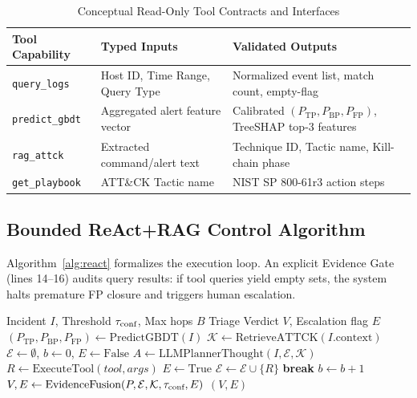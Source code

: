 \begin{table}[h]
\caption{Conceptual Read-Only Tool Contracts and Interfaces}
\label{tab:tool_contracts}
\centering
\small
\begin{tabular}{lp{2.8cm}p{3.2cm}}
\toprule
\textbf{Tool Capability} & \textbf{Typed Inputs} & \textbf{Validated Outputs} \\
\midrule
\texttt{query\_logs} & Host ID, Time Range, Query Type & Normalized event list, match count, empty-flag \\
\texttt{predict\_gbdt} & Aggregated alert feature vector & Calibrated $(P_{\text{TP}}, P_{\text{BP}}, P_{\text{FP}})$, TreeSHAP top-3 features \\
\texttt{rag\_attck} & Extracted command/alert text & Technique ID, Tactic name, Kill-chain phase \\
\texttt{get\_playbook} & ATT\&CK Tactic name & NIST SP 800-61r3 action steps \\
\bottomrule
\end{tabular}
\end{table}

\subsection{Bounded ReAct+RAG Control Algorithm}
Algorithm~\ref{alg:react} formalizes the execution loop. An explicit Evidence Gate (lines 14--16) audits query results: if tool queries yield empty sets, the system halts premature FP closure and triggers human escalation.

\begin{algorithm}[t]
\caption{Bounded ReAct+RAG with Evidence Gate}
\label{alg:react}
\begin{algorithmic}[1]
\REQUIRE Incident $I$, Threshold $\tau_{\text{conf}}$, Max hops $B$
\ENSURE Triage Verdict $V$, Escalation flag $E$
\STATE $(P_{\text{TP}}, P_{\text{BP}}, P_{\text{FP}}) \leftarrow \text{PredictGBDT}(I)$
\STATE $\mathcal{K} \leftarrow \text{RetrieveATTCK}(I.\text{context})$
\STATE $\mathcal{E} \leftarrow \emptyset$, $b \leftarrow 0$, $E \leftarrow \text{False}$
    \STATE $A \leftarrow \text{LLMPlannerThought}(I, \mathcal{E}, \mathcal{K})$
        \STATE $R \leftarrow \text{ExecuteTool}(tool, args)$
            \STATE $E \leftarrow \text{True}$ 
        \ENDIF
        \STATE $\mathcal{E} \leftarrow \mathcal{E} \cup \{R\}$
        \STATE \textbf{break}
    \ENDIF
    \STATE $b \leftarrow b + 1$
\ENDWHILE
\STATE $V, E \leftarrow \text{EvidenceFusion}(P, \mathcal{E}, \mathcal{K}, \tau_{\text{conf}}, E)$
\RETURN $(V, E)$
\end{algorithmic}
\end{algorithm}
